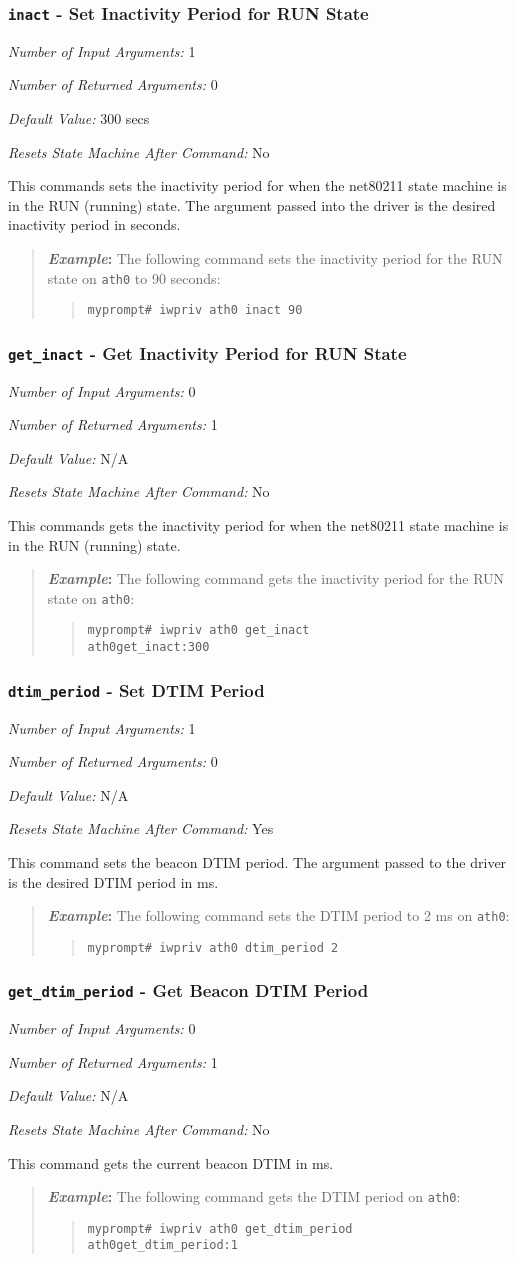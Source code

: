 \documentclass[10pt,fullpage]{article}
\newcommand{\mytt}[1]{{\texttt{#1}}}
\newcommand{\bv}{\begin{verse}}
\newcommand{\ev}{\end{verse}}
\newcommand{\cmd}[1]{{\texttt{myprompt\# #1}}}
\newcommand{\argdesc}[4]{\begin{description}
\itemsep -6pt
\item \textit{Number of Input Arguments:} #1
\item \textit{Number of Returned Arguments:} #2
\item \textit{Default Value:} #3
\item \textit{Resets State Machine After Command:} #4
\end{description}
}
\newenvironment{example}{\begin{quote}\textbf{\textit{Example}:}}{\end{quote}}
\begin{document}
\subsubsection{\mytt{inact} - Set Inactivity Period for RUN
  State}
\argdesc{1}{0}{300 secs}{No}
This commands sets the inactivity period for when the net80211 state
machine is in the RUN (running) state.  The argument passed into the
driver is the desired inactivity period in seconds.
\begin{example}
  The following command sets the inactivity period for the RUN state
  on \mytt{ath0} to 90 seconds:
  \bv
  \cmd{iwpriv ath0 inact 90}
  \ev
\end{example}

\subsubsection{\mytt{get\_inact} - Get Inactivity Period for RUN
  State}
\argdesc{0}{1}{N/A}{No}
This commands gets the inactivity period for when the net80211 state
machine is in the RUN (running) state.
\begin{example}
  The following command gets the inactivity period for the RUN state
  on \mytt{ath0}:
  \bv
  \cmd{iwpriv ath0 get\_inact}\\
  \mytt{ath0\hspace{32pt}get\_inact:300}
  \ev
\end{example}

\subsubsection{\mytt{dtim\_period} - Set DTIM Period}
\argdesc{1}{0}{N/A}{Yes}
This command sets the beacon DTIM period.  The argument passed to the
driver is the desired DTIM period in ms.
\begin{example}
  The following command sets the DTIM period to 2 ms on \mytt{ath0}:
  \bv
  \cmd{iwpriv ath0 dtim\_period 2}
  \ev
\end{example}

\subsubsection{\mytt{get\_dtim\_period} - Get Beacon DTIM Period}
\argdesc{0}{1}{N/A}{No}
This command gets the current beacon DTIM in ms.
\begin{example}
  The following command gets the DTIM period on \mytt{ath0}:
  \bv
  \cmd{iwpriv ath0 get\_dtim\_period}\\
  \mytt{ath0\hspace{32pt}get\_dtim\_period:1}
  \ev
\end{example}
\end{document}
